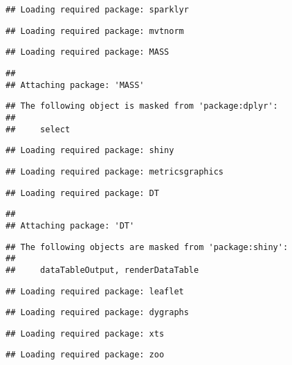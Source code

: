 \documentclass[
]{article}
\begin{document}
\begin{verbatim}
## Loading required package: sparklyr
\end{verbatim}

\begin{verbatim}
## Loading required package: mvtnorm
\end{verbatim}

\begin{verbatim}
## Loading required package: MASS
\end{verbatim}

\begin{verbatim}
## 
## Attaching package: 'MASS'
\end{verbatim}

\begin{verbatim}
## The following object is masked from 'package:dplyr':
## 
##     select
\end{verbatim}

\begin{verbatim}
## Loading required package: shiny
\end{verbatim}

\begin{verbatim}
## Loading required package: metricsgraphics
\end{verbatim}

\begin{verbatim}
## Loading required package: DT
\end{verbatim}

\begin{verbatim}
## 
## Attaching package: 'DT'
\end{verbatim}

\begin{verbatim}
## The following objects are masked from 'package:shiny':
## 
##     dataTableOutput, renderDataTable
\end{verbatim}

\begin{verbatim}
## Loading required package: leaflet
\end{verbatim}

\begin{verbatim}
## Loading required package: dygraphs
\end{verbatim}

\begin{verbatim}
## Loading required package: xts
\end{verbatim}

\begin{verbatim}
## Loading required package: zoo
\end{verbatim}
\end{document}
